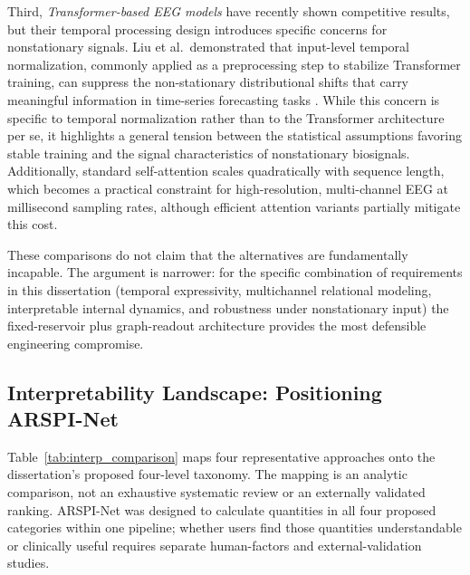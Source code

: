 Third, \emph{Transformer-based EEG models} have recently shown competitive results, but their temporal processing design introduces specific concerns for nonstationary signals. Liu et al.\ demonstrated that input-level temporal normalization, commonly applied as a preprocessing step to stabilize Transformer training, can suppress the non-stationary distributional shifts that carry meaningful information in time-series forecasting tasks \cite{liu_nonstationary_2022}. While this concern is specific to temporal normalization rather than to the Transformer architecture per se, it highlights a general tension between the statistical assumptions favoring stable training and the signal characteristics of nonstationary biosignals. Additionally, standard self-attention scales quadratically with sequence length, which becomes a practical constraint for high-resolution, multi-channel EEG at millisecond sampling rates, although efficient attention variants partially mitigate this cost.

These comparisons do not claim that the alternatives are fundamentally incapable. The argument is narrower: for the specific combination of requirements in this dissertation (temporal expressivity, multichannel relational modeling, interpretable internal dynamics, and robustness under nonstationary input) the fixed-reservoir plus graph-readout architecture provides the most defensible engineering compromise.

\subsection{Interpretability Landscape: Positioning ARSPI-Net}
\label{sec:interp_landscape}

Table~\ref{tab:interp_comparison} maps four representative approaches onto the dissertation's proposed four-level taxonomy. The mapping is an analytic comparison, not an exhaustive systematic review or an externally validated ranking. ARSPI-Net was designed to calculate quantities in all four proposed categories within one pipeline; whether users find those quantities understandable or clinically useful requires separate human-factors and external-validation studies.

